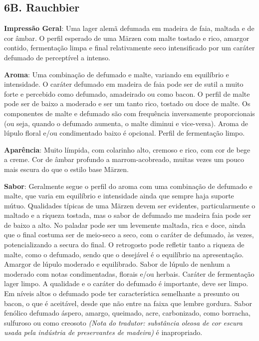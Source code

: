 \subsection*{6B. Rauchbier}
\textbf{Impressão Geral}: Uma lager alemã defumada em madeira de faia, maltada e de cor âmbar. O perfil esperado de uma Märzen com malte tostado e rico, amargor contido, fermentação limpa e final relativamente seco intensificado por um caráter defumado de perceptível a intenso.

\textbf{Aroma}: Uma combinação de defumado e malte, variando em equilíbrio e intensidade. O caráter defumado em madeira de faia pode ser de sutil a muito forte e percebido como defumado, amadeirado ou como bacon. O perfil de malte pode ser de baixo a moderado e ser um tanto rico, tostado ou doce de malte. Os componentes de  malte e defumado são com frequência inversamente proporcionais (ou seja, quando o defumado aumenta, o malte diminui e vice-versa). Aroma de lúpulo floral e/ou condimentado baixo é opcional. Perfil de fermentação limpo.

\textbf{Aparência}: Muito límpida, com colarinho alto, cremoso e rico, com cor de bege a creme. Cor de âmbar profundo a marrom-acobreado, muitas vezes um pouco mais escura do que o estilo base Märzen.

\textbf{Sabor}: Geralmente segue o perfil do aroma com uma combinação de defumado e malte, que varia em equilíbrio e intensidade ainda que sempre haja suporte mútuo. Qualidades típicas de uma Märzen devem ser evidentes, particularmente o maltado e a riqueza tostada, mas o sabor de defumado me madeira faia pode ser de baixo a alto. No paladar pode ser um levemente maltada, rica e doce, ainda que o final costuma ser de meio-seco a seco, com o caráter de defumado, às vezes, potencializando a secura do final. O retrogosto pode refletir tanto a riqueza de malte, como o defumado, sendo que o desejável é o equilíbrio na apresentação. Amargor de lúpulo moderado e equilibrado. Sabor de lúpulo de nenhum a moderado com notas condimentadas, florais e/ou herbais. Caráter de fermentação lager limpo. A qualidade e o caráter do defumado é importante, deve ser limpo. Em níveis altos o defumado pode ter característica semelhante a presunto ou bacon, o que é aceitável, desde que não entre na faixa que lembre gordura. Sabor fenólico defumado áspero, amargo, queimado, acre, carbonizado, como borracha, sulfuroso ou como creosoto \textit{(Nota do tradutor: substância oleosa de cor escura usada pela indústria de preservantes de madeira)} é inapropriado.


